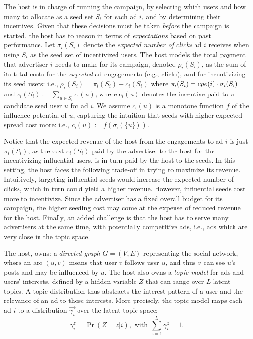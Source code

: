 The host is in charge of running the campaign, by selecting which users and how many to allocate as a seed set $S_i$ for each ad $i$, and by determining their incentives.
Given that these decisions must be taken \emph{before} the campaign is started, the host has to reason in terms of \emph{expectations} based on past performance.
Let $\sigma_i(S_i)$ denote the \emph{expected number of clicks} ad $i$ receives when using $S_i$ as the seed set of incentivized users. The host models
the total payment that advertiser $i$ needs to make for its campaign, denoted  $\rho_i(S_i)$, as the sum of its total costs for the \emph{expected}  ad-engagements (e.g., clicks), and for incentivizing its seed users: i.e., $\rho_i(S_i) = \pi_i(S_i) + c_i(S_i)$ where $\pi_i(S_i) = cpe({i}) \cdot \sigma_i(S_i)$ and $c_i(S_i) := \sum_{u \in S_i} c_i(u)$, where $c_i(u)$ denotes the incentive paid to a candidate seed user $u$ for ad $i$.
%
We assume $c_i(u)$ is a monotone function $f$ of the influence potential of $u$, capturing the intuition that seeds with higher expected spread cost more: i.e., $c_i(u) := f(\sigma_i(\{u\}))$.

Notice that the expected revenue of the host from the engagements to ad $i$ is just  $\pi_i(S_i)$, as the cost $c_i(S_i)$ paid by the advertiser to the host for the incentivizing influential users, is in turn paid by the host to the seeds.
In this setting, the host faces the following trade-off in trying to maximize its revenue. Intuitively, targeting influential seeds would increase the expected number of clicks, which in turn could yield a higher revenue. However, influential seeds cost more to incentivize. Since the advertiser has a fixed overall budget for its campaign, the higher seeding cost may come at the expense of reduced revenue for the host.
Finally, an added challenge is that the host has to serve many advertisers at the same time, with potentially competitive ads, i.e., ads which are very close in the topic space.

 The host, owns:
a \emph{directed graph} $G=(V,E)$ representing the social network, where an arc $(u,v)$ means that user $v$ follows user $u$, and thus $v$ can see $u$'s posts and may be influenced by $u$. The host also owns a \emph{topic model} for ads and users' interests, defined  by a hidden variable $Z$ that can range over $L$ latent topics. A topic distribution thus abstracts the interest pattern of a user and the relevance of an ad to those interests. More precisely, the topic model  maps each ad $i$ to a distribution $\vec{\gamma_i}$ over the latent topic space:
$$\gamma_i^z = \Pr(Z=z|i), \mbox{ with } \sum_{z = 1}^L\gamma_i^z = 1.$$

